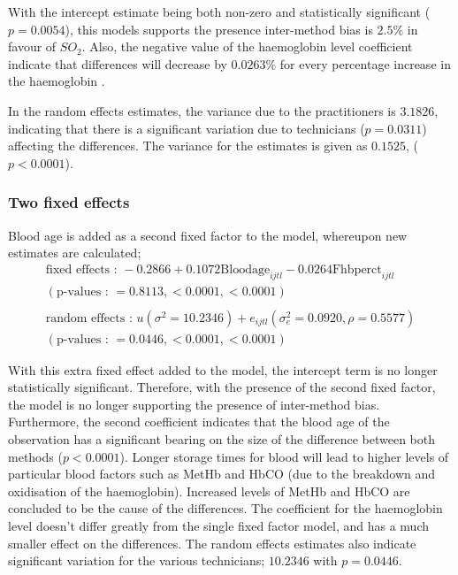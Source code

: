 \documentclass[12pt, a4paper]{report}
\theoremstyle{plain}
\theoremstyle{definition}
\theoremstyle{remark}
\begin{document}
	With the intercept estimate being both non-zero and statistically
	significant ($p=0.0054$), this models supports the presence
	inter-method bias is $2.5\%$ in favour of $SO_{2}$. Also, the
	negative value of the haemoglobin level coefficient indicate that
	differences will decrease by $0.0263\%$ for every percentage
	increase in the haemoglobin .
	
	In the random effects estimates, the variance due to the
	practitioners is $3.1826$, indicating that there is a significant
	variation due to technicians ($p=0.0311$) affecting the
	differences. The variance for the estimates is given as $0.1525$,
	($p<0.0001$).
	
	\subsubsection{Two fixed effects}
	Blood age is added as a second fixed factor to the model,
	whereupon new estimates are calculated;
	\begin{eqnarray}
	\mbox{fixed effects :   } -0.2866 + 0.1072 \mbox{Bloodage}_{ijtl}
	- 0.0264\mbox{Fhbperct}_{ijtl}\nonumber\\
	( \mbox{p-values :   } = 0.8113, <0.0001, <0.0001)\nonumber\\\nonumber\\
	\mbox{random effects :   } u(\sigma^{2}=10.2346) + e_{ijtl}
	(\sigma^{2}_{e}=0.0920, \rho= 0.5577) \nonumber\\
	(\mbox{p-values :   } = 0.0446, <0.0001, <0.0001)
	\end{eqnarray}
	
	
	With this extra fixed effect added to the model, the intercept
	term is no longer statistically significant. Therefore, with the
	presence of the second fixed factor, the model is no longer
	supporting the presence of inter-method bias. Furthermore, the
	second coefficient indicates that the blood age of the observation
	has a significant bearing on the size of the difference between
	both methods ($p <0.0001$). Longer storage times for blood will
	lead to higher levels of particular blood factors such as MetHb
	and HbCO (due to the breakdown and oxidisation of the
	haemoglobin). Increased levels of MetHb and HbCO are concluded to
	be the cause of the differences. The coefficient for the
	haemoglobin level doesn't differ greatly from the single fixed
	factor model, and has a much smaller effect on the differences.
	The random effects estimates also indicate significant variation
	for the various technicians; $10.2346$ with $p=0.0446$.
	
\end{document}
